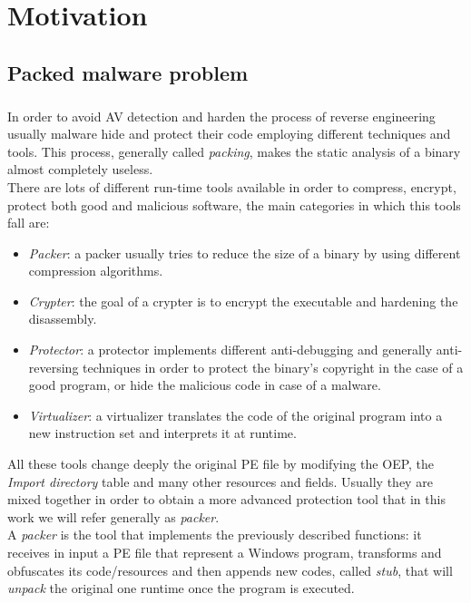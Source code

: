 \chapter{Motivation}
\label{chapter2}
\thispagestyle{empty}

\section{Packed malware problem}
\paragraph{}
In order to avoid \ac{AV} detection and harden the process of reverse engineering usually malware hide and protect their code employing different techniques and tools. This process, generally called \textit{packing}, makes the static analysis of a binary almost completely useless.\\
There are lots of different run-time tools available in order to compress, encrypt, protect both good and malicious software, the main categories in which this tools fall are:
\begin{itemize}
\item \emph{Packer}: a packer usually tries to reduce the size of a binary by using different compression algorithms.
\item \emph{Crypter}: the goal of a crypter is to encrypt the executable and hardening the disassembly.
\item \emph{Protector}: a protector implements different anti-debugging and generally anti-reversing techniques in order to protect the binary's copyright in the case of a good program, or hide the malicious code in case of a malware.
\item \emph{Virtualizer}: a virtualizer translates the code of the original program into a new  instruction set and  interprets it at runtime.
\end{itemize}
All these tools change deeply the original \ac{PE} file by modifying the \ac{OEP}, the \textit{Import directory} table and many other resources and fields. Usually they are mixed together in order to obtain a more advanced protection tool that in this work we will refer generally as \textit{packer}.\\
A \textit{packer} is the tool that implements the previously described functions: it receives in input a \ac{PE} file that represent a Windows program, transforms and obfuscates its code/resources and then appends new codes, called \textit{stub}, that will \textit{unpack} the original one runtime once the program is executed.
